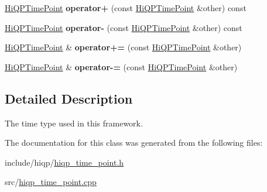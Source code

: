 \begin{DoxyCompactItemize}
\item 
\hypertarget{classhiqp_1_1HiQPTimePoint_a813483d1fa797b8bebbaefc9cd27870d}{\hyperlink{classhiqp_1_1HiQPTimePoint}{Hi\-Q\-P\-Time\-Point} {\bfseries operator+} (const \hyperlink{classhiqp_1_1HiQPTimePoint}{Hi\-Q\-P\-Time\-Point} \&other) const }\label{classhiqp_1_1HiQPTimePoint_a813483d1fa797b8bebbaefc9cd27870d}

\item 
\hypertarget{classhiqp_1_1HiQPTimePoint_a61ceef1e9ddeec9e978475bd5f0e48dd}{\hyperlink{classhiqp_1_1HiQPTimePoint}{Hi\-Q\-P\-Time\-Point} {\bfseries operator-\/} (const \hyperlink{classhiqp_1_1HiQPTimePoint}{Hi\-Q\-P\-Time\-Point} \&other) const }\label{classhiqp_1_1HiQPTimePoint_a61ceef1e9ddeec9e978475bd5f0e48dd}

\item 
\hypertarget{classhiqp_1_1HiQPTimePoint_a708129ca0c4ff820f74b038b154d2525}{\hyperlink{classhiqp_1_1HiQPTimePoint}{Hi\-Q\-P\-Time\-Point} \& {\bfseries operator+=} (const \hyperlink{classhiqp_1_1HiQPTimePoint}{Hi\-Q\-P\-Time\-Point} \&other)}\label{classhiqp_1_1HiQPTimePoint_a708129ca0c4ff820f74b038b154d2525}

\item 
\hypertarget{classhiqp_1_1HiQPTimePoint_a3c4c20abe8dfe903154267465de2fd18}{\hyperlink{classhiqp_1_1HiQPTimePoint}{Hi\-Q\-P\-Time\-Point} \& {\bfseries operator-\/=} (const \hyperlink{classhiqp_1_1HiQPTimePoint}{Hi\-Q\-P\-Time\-Point} \&other)}\label{classhiqp_1_1HiQPTimePoint_a3c4c20abe8dfe903154267465de2fd18}

\end{DoxyCompactItemize}


\subsection{Detailed Description}
The time type used in this framework. 

The documentation for this class was generated from the following files\-:\begin{DoxyCompactItemize}
\item 
include/hiqp/\hyperlink{hiqp__time__point_8h}{hiqp\-\_\-time\-\_\-point.\-h}\item 
src/\hyperlink{hiqp__time__point_8cpp}{hiqp\-\_\-time\-\_\-point.\-cpp}\end{DoxyCompactItemize}
